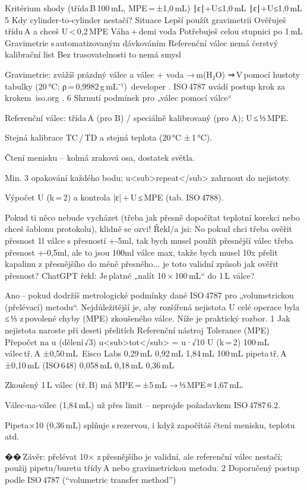 Kritérium shody (třída B 100 mL, MPE = ±1,0 mL)
∣ε∣+U≤1,0 mL
∣ε∣+U≤1,0 mL
5  Kdy cylinder‑to‑cylinder nestačí?
Situace	Lepší použít gravimetrii
Ověřuješ třídu A a chceš U < 0,2 MPE	Váha + demi voda
Potřebuješ celou stupnici po 1 mL	Gravimetrie s automatizovaným dávkováním
Referenční válec nemá čerstvý kalibrační list	Bez trasovatelnosti to nemá smysl

Gravimetrie: zvážíš prázdný válec a válec + voda → m(H₂O) ⇒ V pomocí hustoty tabulky (20 °C: ρ = 0,9982 g mL⁻¹) 
developer
. ISO 4787 uvádí postup krok za krokem 
iso.org
.
6  Shrnutí podmínek pro „válec pomocí válce“

    Referenční válec: třída A (pro B) / speciálně kalibrovaný (pro A); U ≤ ⅓ MPE.

    Stejná kalibrace TC / TD a stejná teplota (20 °C ± 1 °C).

    Čtení menisku – kolmá zraková osa, dostatek světla.

    Min. 3 opakování každého bodu; u<sub>repeat</sub> zahrnout do nejistoty.

    Výpočet U (k = 2) a kontrola |ε| + U ≤ MPE (tab. ISO 4788).

Pokud ti něco nebude vycházet (třeba jak přesně dopočítat teplotní korekci nebo chceš šablonu protokolu), klidně se ozvi!
Řekl/a jsi:
No pokud chci třeba ověřit přesnost 1l válce s přesností +-5ml, tak bych musel použít přesnější válec třeba přesnost +-0,5ml, ale to jsou 100ml válce max, takže bych musel 10x přelit kapalinu z přesnějšího do méně přesného... je toto validní způsob jak ověřit přesnost?
ChatGPT řekl:
Je platné „nalít 10 × 100 mL“ do 1 L válce?

Ano – pokud dodržíš metrologické podmínky dané ISO 4787 pro „volumetrickou (přelévací) metodu“. Nejdůležitější je, aby rozšířená nejistota U celé operace byla ≤ ⅓ z povolené chyby (MPE) zkoušeného válce. Níže je praktický rozbor.
1  Jak nejistota naroste při deseti přelitích
Referenční nástroj	Tolerance (MPE)	Přepočet na u (dělení √3)	u<sub>tot</sub> = u·√10	U (k = 2)
100 mL válec tř. A	±0,50 mL 
Eisco Labs
	0,29 mL	0,92 mL	1,84 mL
100 mL pipeta tř. A	±0,10 mL (ISO 648)	0,058 mL	0,18 mL	0,36 mL

Zkoušený 1 L válec (tř. B) má MPE = ±5 mL → ⅓ MPE ≈ 1,67 mL.

    Válec‑na‑válec (1,84 mL) už přes limit – neprojde požadavkem ISO 4787 6.2.

    Pipeta×10 (0,36 mL) splňuje s rezervou, i když započítáš čtení menisku, teplotu atd.

�� Závěr: přelévat 10× z přesnějšího je validní, ale referenční válec nestačí; použij pipetu/buretu třídy A nebo gravimetrickou metodu.
2  Doporučený postup podle ISO 4787 (“volumetric transfer method”)

